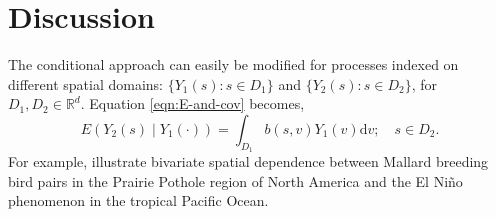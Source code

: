 \documentclass[lineno]{biometrika}
\newcommand{\Deltab} {\Delta}
\newcommand{\intd} {\textrm{d}}
\newcommand{\svec} {s}
\renewcommand{\v}{v}
\newcommand{\Yvec}{Y}
\newcommand{\Zvec}{Z}
\newcommand{\E}{E}
\begin{document}











\section{Discussion}\label{sec:6}

The conditional approach can easily be modified for processes indexed on different spatial domains: $\{Y_1(\svec): \svec \in D_1\}$ and $\{Y_2(\svec): \svec \in D_2\}$, for $D_1, D_2 \in \mathbb{R}^d$. Equation \eqref{eqn:E-and-cov} becomes,
\begin{equation*}
\E(Y_2(\svec) \mid  Y_1(\cdot)) = \int_{D_1}b(\svec,\v)Y_1(\v)\intd\v;\quad\svec \in D_2.
\end{equation*}
\noindent For example, \citet[][p.~287]{CressieWikle2011} illustrate bivariate spatial dependence between Mallard breeding bird pairs in the Prairie Pothole region of North America and the El Ni\~{n}o phenomenon in the tropical Pacific Ocean.
\end{document}
